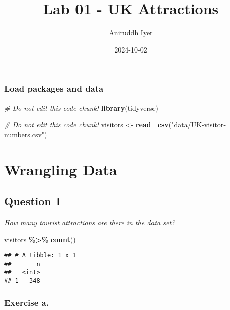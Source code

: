 \documentclass[
]{article}
\title{Lab 01 - UK Attractions}
\author{Aniruddh Iyer}
\date{2024-10-02}
\newenvironment{Shaded}{\begin{snugshade}}{\end{snugshade}}
\newcommand{\CommentTok}[1]{\textcolor[rgb]{0.56,0.35,0.01}{\textit{#1}}}
\newcommand{\FunctionTok}[1]{\textcolor[rgb]{0.13,0.29,0.53}{\textbf{#1}}}
\newcommand{\NormalTok}[1]{#1}
\newcommand{\OtherTok}[1]{\textcolor[rgb]{0.56,0.35,0.01}{#1}}
\newcommand{\SpecialCharTok}[1]{\textcolor[rgb]{0.81,0.36,0.00}{\textbf{#1}}}
\newcommand{\StringTok}[1]{\textcolor[rgb]{0.31,0.60,0.02}{#1}}
\begin{document}
\maketitle

\subsubsection{Load packages and data}\label{load-packages-and-data}

\begin{Shaded}
\begin{Highlighting}[]
\CommentTok{\# Do not edit this code chunk!}
\FunctionTok{library}\NormalTok{(tidyverse) }
\end{Highlighting}
\end{Shaded}

\begin{Shaded}
\begin{Highlighting}[]
\CommentTok{\# Do not edit this code chunk!}
\NormalTok{visitors }\OtherTok{\textless{}{-}} \FunctionTok{read\_csv}\NormalTok{(}\StringTok{"data/UK{-}visitor{-}numbers.csv"}\NormalTok{)}
\end{Highlighting}
\end{Shaded}

\section{Wrangling Data}\label{wrangling-data}

\subsection{Question 1}\label{question-1}

\emph{How many tourist attractions are there in the data set?}

\begin{Shaded}
\begin{Highlighting}[]
\NormalTok{visitors }\SpecialCharTok{\%\textgreater{}\%} \FunctionTok{count}\NormalTok{()}
\end{Highlighting}
\end{Shaded}

\begin{verbatim}
## # A tibble: 1 x 1
##       n
##   <int>
## 1   348
\end{verbatim}

\subsubsection{Exercise a.}\label{exercise-a.}
\end{document}
